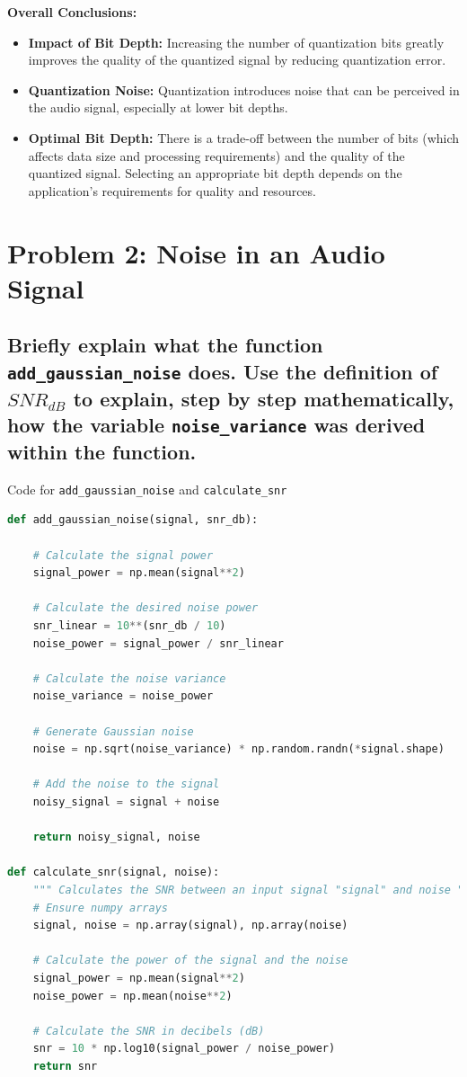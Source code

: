 \documentclass[10pt]{article}
\theoremstyle{definition}
\theoremstyle{remark}
\theoremstyle{definition}
\numberwithin{equation}{prob}
\begin{document}
\textbf{Overall Conclusions:}

\begin{itemize}
    \item \textbf{Impact of Bit Depth:} Increasing the number of quantization bits greatly improves the quality of the quantized signal by reducing quantization error.
    \item \textbf{Quantization Noise:} Quantization introduces noise that can be perceived in the audio signal, especially at lower bit depths.
    \item \textbf{Optimal Bit Depth:} There is a trade-off between the number of bits (which affects data size and processing requirements) and the quality of the quantized signal. Selecting an appropriate bit depth depends on the application's requirements for quality and resources.
\end{itemize}

\section{Problem 2: Noise in an Audio Signal}

\subsection{Briefly explain what the function \texttt{add\_gaussian\_noise} does. Use the definition of \( SNR_{dB} \) to explain, step by step mathematically, how the variable \texttt{noise\_variance} was derived within the function.}

Code for \texttt{add\_gaussian\_noise} and \texttt{calculate\_snr}

\begin{lstlisting}[language=Python]
def add_gaussian_noise(signal, snr_db):

    # Calculate the signal power
    signal_power = np.mean(signal**2)

    # Calculate the desired noise power
    snr_linear = 10**(snr_db / 10)
    noise_power = signal_power / snr_linear

    # Calculate the noise variance
    noise_variance = noise_power

    # Generate Gaussian noise
    noise = np.sqrt(noise_variance) * np.random.randn(*signal.shape)

    # Add the noise to the signal
    noisy_signal = signal + noise

    return noisy_signal, noise

def calculate_snr(signal, noise):
    """ Calculates the SNR between an input signal "signal" and noise "noise" """
    # Ensure numpy arrays
    signal, noise = np.array(signal), np.array(noise)

    # Calculate the power of the signal and the noise
    signal_power = np.mean(signal**2)
    noise_power = np.mean(noise**2)

    # Calculate the SNR in decibels (dB)
    snr = 10 * np.log10(signal_power / noise_power)
    return snr
\end{lstlisting}
\end{document}
